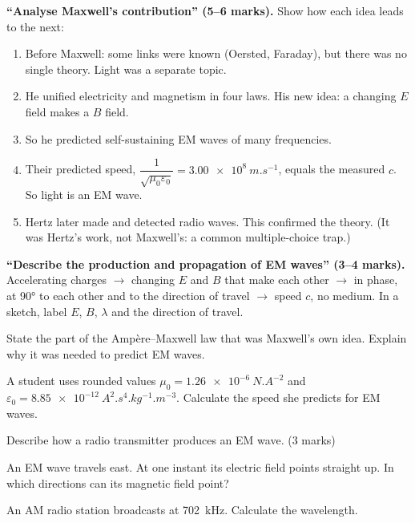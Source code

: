 \begin{examtip}[breakable]
\textbf{``Analyse Maxwell's contribution'' (5--6 marks).} Show how each idea leads to the next:
\begin{enumerate}
  \item Before Maxwell: some links were known (Oersted, Faraday), but there was no single
        theory. Light was a separate topic.
  \item He unified electricity and magnetism in four laws. His new idea: a changing $E$ field
        makes a $B$ field.
  \item So he predicted self-sustaining EM waves of many frequencies.
  \item Their predicted speed, $\dfrac{1}{\sqrt{\mu_0\varepsilon_0}} = \qty{3.00e8}{m.s^{-1}}$,
        equals the measured $c$. So light is an EM wave.
  \item Hertz later made and detected radio waves. This confirmed the theory. (It was Hertz's
        work, not Maxwell's: a common multiple-choice trap.)
\end{enumerate}
\textbf{``Describe the production and propagation of EM waves'' (3--4 marks).} Accelerating
charges $\to$ changing $E$ and $B$ that make each other $\to$ in phase, at \ang{90} to each other
and to the direction of travel $\to$ speed $c$, no medium. In a sketch, label $E$, $B$,
$\lambda$ and the direction of travel.
\end{examtip}

\begin{quickcheck}
  \item State the part of the Ampère--Maxwell law that was Maxwell's own idea. Explain why it was
        needed to predict EM waves.\label{ch1:qc:addition}
  \item A student uses rounded values $\mu_0 = \qty{1.26e-6}{N.A^{-2}}$ and
        $\varepsilon_0 = \qty{8.85e-12}{A^2.s^4.kg^{-1}.m^{-3}}$. Calculate the speed she
        predicts for EM waves.
  \item Describe how a radio transmitter produces an EM wave. (3 marks)
  \item An EM wave travels east. At one instant its electric field points straight up. In which
        directions can its magnetic field point?
  \item An AM radio station broadcasts at \qty{702}{kHz}. Calculate the wavelength.
\end{quickcheck}

